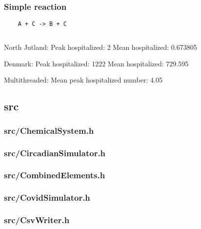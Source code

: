 \subsubsection{Simple reaction}
\begin{verbatim}
    A + C -> B + C
\end{verbatim}

\subsection{}
North Jutland:
Peak hospitalized: 2
Mean hospitalized: 0.673805

Denmark:
Peak hospitalized: 1222
Mean hospitalized: 729.595

Multithreaded:
Mean peak hospitalized number: 4.05

\newpage
\subsection{src}
\subsubsection{src/ChemicalSystem.h}

\newpage
\subsubsection{src/CircadianSimulator.h}

\newpage
\subsubsection{src/CombinedElements.h}

\newpage
\subsubsection{src/CovidSimulator.h}

\newpage
\subsubsection{src/CsvWriter.h}

\newpage
